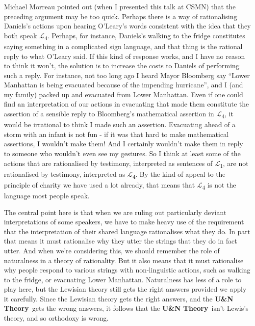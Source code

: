 \documentclass[
  11pt,
  letterpaper,
  DIV=11,
  numbers=noendperiod,
  twoside]{scrartcl}
\begin{document}
Michael Morreau pointed out (when I presented this talk at CSMN) that
the preceding argument may be too quick. Perhaps there is a way of
rationalising Daniels's actions upon hearing O'Leary's words consistent
with the idea that they both speak \(\mathcal{L}\)\textsubscript{4}.
Perhaps, for instance, Daniels's walking to the fridge constitutes
saying something in a complicated sign language, and that thing is the
rational reply to what O'Leary said. If this kind of response works, and
I have no reason to think it won't, the solution is to increase the
costs to Daniels of performing such a reply. For instance, not too long
ago I heard Mayor Bloomberg say ``Lower Manhattan is being evacuated
because of the impending hurricane'', and I (and my family) packed up
and evacuated from Lower Manhattan. Even if one could find an
interpretation of our actions in evacuating that made them constitute
the assertion of a sensible reply to Bloomberg's mathematical assertion
in \(\mathcal{L}\)\textsubscript{4}, it would be irrational to think I
made such an assertion. Evacuating ahead of a storm with an infant is
not fun - if it was that hard to make mathematical assertions, I
wouldn't make them! And I certainly wouldn't make them in reply to
someone who wouldn't even see my gestures. So I think at least some of
the actions that are rationalised by testimony, interpreted as sentences
of \(\mathcal{L}\)\textsubscript{1}, are not rationalised by testimony,
interpreted as \(\mathcal{L}\)\textsubscript{4}. By the kind of appeal
to the principle of charity we have used a lot already, that means that
\(\mathcal{L}\)\textsubscript{4} is not the language most people speak.

The central point here is that when we are ruling out particularly
deviant interpretations of some speakers, we have to make heavy use of
the requirement that the interpretation of their shared language
rationalises what they do. In part that means it must rationalise why
they utter the strings that they do in fact utter. And when we're
considering this, we should remember the role of naturalness in a theory
of rationality. But it also means that it must rationalise why people
respond to various strings with non-linguistic actions, such as walking
to the fridge, or evacuating Lower Manhattan. Naturalness has less of a
role to play here, but the Lewisian theory still gets the right answers
provided we apply it carefully. Since the Lewisian theory gets the right
answers, and the \textbf{U\&N Theory}~gets the wrong answers, it follows
that the \textbf{U\&N Theory}~isn't Lewis's theory, and so orthodoxy is
wrong.
\end{document}
